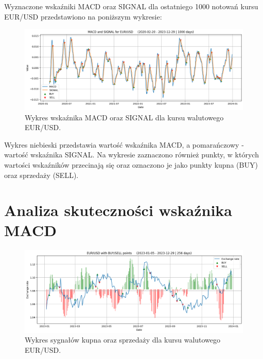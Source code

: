 \documentclass[12pt, a4paper]{article}
\begin{document}
\pagebreak






Wyznaczone wskaźniki MACD oraz SIGNAL dla ostatniego 1000 notowań kursu EUR/USD
przedstawiono na poniższym wykresie:

\begin{figure}[ht]
    \centering
    \includegraphics[width=1.0\textwidth]{eur_usd_macd_signal.png}
    \caption{Wykres wskaźnika MACD oraz SIGNAL dla kursu walutowego EUR/USD.}
    \label{fig:eur_usd_macd_signal}
\end{figure}

Wykres niebieski przedstawia wartość wskaźnika MACD, a pomarańczowy - wartość wskaźnika SIGNAL.
Na wykresie zaznaczono również punkty, w których wartości wskaźników przecinają się oraz
oznaczono je jako punkty kupna (BUY) oraz sprzedaży (SELL).


\section{Analiza skuteczności wskaźnika MACD}

\begin{figure}[ht]
    \centering
    \includegraphics[width=1.0\textwidth]{eur_usd_value_buy_sell.png}
    \caption{Wykres sygnałów kupna oraz sprzedaży dla kursu walutowego EUR/USD.}
    \label{fig:eur_usd_value_buy_sell}
\end{figure}
\end{document}
